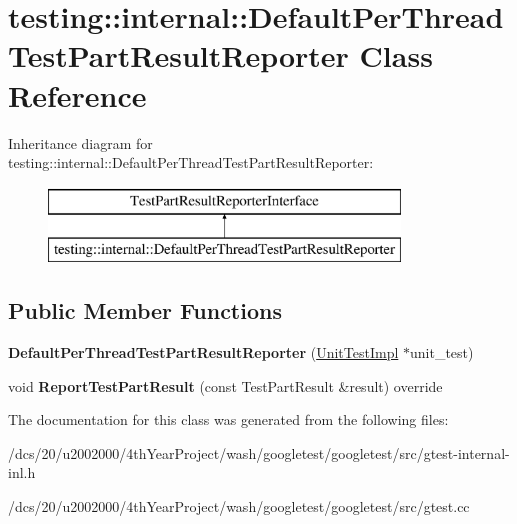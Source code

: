 \hypertarget{classtesting_1_1internal_1_1DefaultPerThreadTestPartResultReporter}{}\section{testing\+:\+:internal\+:\+:Default\+Per\+Thread\+Test\+Part\+Result\+Reporter Class Reference}
\label{classtesting_1_1internal_1_1DefaultPerThreadTestPartResultReporter}
Inheritance diagram for testing\+:\+:internal\+:\+:Default\+Per\+Thread\+Test\+Part\+Result\+Reporter\+:\begin{figure}[H]
\begin{center}
\leavevmode
\includegraphics[height=2.000000cm]{classtesting_1_1internal_1_1DefaultPerThreadTestPartResultReporter}
\end{center}
\end{figure}
\subsection*{Public Member Functions}
\begin{DoxyCompactItemize}
\item 
\mbox{\label{classtesting_1_1internal_1_1DefaultPerThreadTestPartResultReporter_a968a846e5a90d2ffea8b2ce2746099bd}} 
{\bfseries Default\+Per\+Thread\+Test\+Part\+Result\+Reporter} (\mbox{\hyperlink{classtesting_1_1internal_1_1UnitTestImpl}{Unit\+Test\+Impl}} $\ast$unit\+\_\+test)
\item 
\mbox{\label{classtesting_1_1internal_1_1DefaultPerThreadTestPartResultReporter_abc9fbfe0dd643ffb9fccb117745c2c21}} 
void {\bfseries Report\+Test\+Part\+Result} (const Test\+Part\+Result \&result) override
\end{DoxyCompactItemize}


The documentation for this class was generated from the following files\+:\begin{DoxyCompactItemize}
\item 
/dcs/20/u2002000/4th\+Year\+Project/wash/googletest/googletest/src/gtest-\/internal-\/inl.\+h\item 
/dcs/20/u2002000/4th\+Year\+Project/wash/googletest/googletest/src/gtest.\+cc\end{DoxyCompactItemize}
